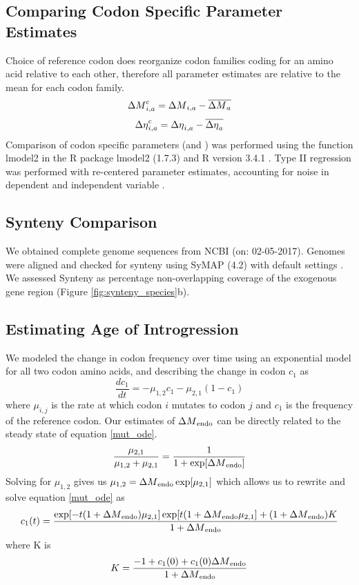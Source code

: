 \subsection{Comparing Codon Specific Parameter Estimates}
Choice of reference codon does reorganize codon families coding for an amino acid relative to each other, therefore all parameter estimates are relative to the mean for each codon family.
\begin{equation}
{\Delta M}_{i,a}^c = {\Delta M}_{i,a} - \overline{{\Delta M}_a}
\end{equation}
\begin{equation}
{\Delta \eta}_{i,a}^c = {\Delta \eta}_{i,a} - \overline{{\Delta \eta}_a}
\end{equation}
Comparison of codon specific parameters (\DM and \DE) was performed using the function lmodel2 in the R package lmodel2 (1.7.3) \citep{lmodel2} and R version 3.4.1 \citep{rcore}.
Type II regression was performed with re-centered parameter estimates, accounting for noise in dependent and independent variable \citep{SokalAndRohlf1981}.


\subsection{Synteny Comparison}
We obtained complete genome sequences from NCBI (on: 02-05-2017).
Genomes were aligned and checked for synteny using SyMAP (4.2) with default settings \citep{soderlund2006, soderlund2011}.
We assessed Synteny as percentage non-overlapping coverage of the exogenous gene region (Figure \ref{fig:synteny_species}b).

\subsection{Estimating Age of Introgression}
We modeled the change in codon frequency over time using an exponential model for all two codon amino acids, and describing the change in codon $c_1$ as
\begin{equation}
\frac{d c_1}{d t} = -\mu_{1,2}c_1 - \mu_{2,1}(1-c_1)
\label{mut_ode}
\end{equation}
where $\mu_{i,j}$ is the rate at which codon $i$ mutates to codon $j$ and $c_1$ is the frequency of the reference codon.
Our estimates of ${\Delta M}_\text{endo}$ can be directly related to the steady state of equation \ref{mut_ode}.
\begin{equation}
\frac{\mu_{2,1}}{\mu_{1,2} + \mu_{2,1}} = \frac{1}{1+\exp[{\Delta M}_\text{endo}]}
\end{equation}
Solving for $\mu_{1,2}$ gives us $\mu_{1,2} = {\Delta M}_\text{endo}\exp[\mu_{2,1}]$ which allows us to rewrite and solve equation \ref{mut_ode} as
\begin{equation}
c_1(t) = \frac{\exp[-t(1+{\Delta M}_\text{endo})\mu_{2,1}]\exp[t(1+{\Delta M}_\text{endo}\mu_{2,1}] + (1+{\Delta M}_\text{endo})K}{1+{\Delta M}_\text{endo}}
\label{mut_close_form}
\end{equation}
where K is
\begin{equation}
K = \frac{-1 + c_1(0) + c_1(0){\Delta M}_\text{endo}}{1+{\Delta M}_\text{endo}}
\end{equation}


